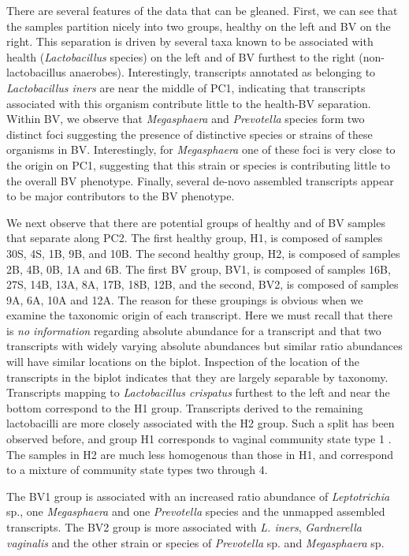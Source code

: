 \documentclass[10pt,letterpaper]{article}
\begin{document}
There are several features of the data that can be gleaned. First, we can see that the samples partition nicely into two groups, healthy on the left and BV on the right.   This separation is driven by several taxa known to be associated with health (\emph{Lactobacillus} species) on the left and of BV furthest to the right (non-lactobacillus anaerobes).  Interestingly, transcripts annotated as belonging to \emph{Lactobacillus iners} are near the middle of PC1, indicating that transcripts associated with this organism contribute little to the health-BV separation.  Within BV, we observe that \emph{Megasphaera} and \emph{Prevotella} species form two distinct foci suggesting the presence of distinctive species or strains of these organisms in BV. Interestingly, for \emph{Megasphaera} one of these foci is very close to the origin on PC1, suggesting that this strain or species is contributing little to the overall BV phenotype. Finally, several de-novo assembled transcripts appear to be major contributors to the BV phenotype.

We next observe that there are potential groups of healthy and of BV samples that separate along PC2. The first healthy group, H1, is composed of samples 30S, 4S, 1B, 9B, and 10B. The second healthy group, H2, is composed of samples 2B, 4B, 0B, 1A and 6B. The first BV group, BV1, is composed of samples 16B, 27S, 14B, 13A, 8A, 17B, 18B, 12B, and the second, BV2, is composed of samples 9A, 6A, 10A and 12A. The reason for these groupings is obvious when we examine the taxonomic origin of each transcript.  Here we must recall that there is \emph{no information} regarding absolute abundance for a transcript and that two transcripts with widely varying absolute abundances but similar ratio abundances will have similar locations on the biplot. Inspection of the location of the transcripts in the biplot indicates that they are largely separable by taxonomy. Transcripts mapping to \emph{Lactobacillus crispatus}  furthest to the left and near the bottom correspond to the H1 group. Transcripts derived to the remaining lactobacilli are more closely associated with the H2 group. Such a split has been observed before, and group H1 corresponds to vaginal community state type 1 \cite{Ravel:2010}. The samples in H2 are much less homogenous than those in H1, and correspond  to a mixture of community state types two through 4. 

The BV1 group is associated with an increased ratio abundance of \emph{Leptotrichia} sp., one  \emph{Megasphaera} and one \emph{Prevotella} species and the unmapped assembled transcripts. The BV2 group is more associated with \emph{L. iners}, \emph{Gardnerella vaginalis} and the other strain or species of \emph{Prevotella} sp. and \emph{Megasphaera} sp. 
\end{document}
